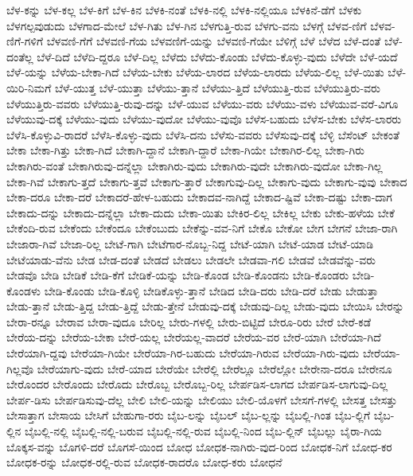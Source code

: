 {ಬೆಳ-ಕನ್ನು
ಬೆಳ-ಕಲ್ಲ
ಬೆಳ-ಕಿಗೆ
ಬೆಳ-ಕಿನ
ಬೆಳಕಿ-ನಂತೆ
ಬೆಳಕಿ-ನಲ್ಲಿ
ಬೆಳಕಿ-ನಲ್ಲಿಯೂ
ಬೆಳಕಿನೆ-ಡೆಗೆ
ಬೆಳಕು
ಬೆಳಗಲ್ಪವುಡುದು
ಬೆಳಗಾದ-ಮೇಲೆ
ಬೆಳ-ಗಿತು
ಬೆಳ-ಗಿನ
ಬೆಳಗುತ್ತಿ-ರುವ
ಬೆಳಗು-ವನು
ಬೆಳಗ್ಗೆ
ಬೆಳವ-ಣಿಗೆ
ಬೆಳವ-ಣಿಗೆ-ಗಳಿಗೆ
ಬೆಳವಣಿ-ಗೆಗೆ
ಬೆಳವಣಿ-ಗೆಯ
ಬೆಳವಣಿಗೆ-ಯನ್ನು
ಬೆಳವಣಿ-ಗೆಯೇ
ಬೆಳಿಗ್ಗೆ
ಬೆಳೆ
ಬೆಳೆದ
ಬೆಳೆ-ದಂತೆ
ಬೆಳೆ-ದಂತೆಲ್ಲ
ಬೆಳೆ-ದಿದೆ
ಬೆಳೆದಿ-ದ್ದರೂ
ಬೆಳೆ-ದಿಲ್ಲ
ಬೆಳೆದು
ಬೆಳೆದು-ಕೊಂಡು
ಬೆಳೆದು-ಕೊಳ್ಳು-ವುದು
ಬೆಳೆದೇ
ಬೆಳೆ-ಯದೆ
ಬೆಳೆ-ಯನ್ನು
ಬೆಳೆಯ-ಬೇಕಾ-ಗಿದೆ
ಬೆಳೆಯ-ಬೇಕು
ಬೆಳೆಯ-ಲಾರದ
ಬೆಳೆಯ-ಲಾರದು
ಬೆಳೆಯ-ಲಿಲ್ಲ
ಬೆಳೆ-ಯಿತು
ಬೆಳೆ-ಯಿರಿ-ನಿಮಗೆ
ಬೆಳೆ-ಯುತ್ತ
ಬೆಳೆ-ಯುತ್ತಾ
ಬೆಳೆಯು-ತ್ತಾನೆ
ಬೆಳೆಯು-ತ್ತಿದೆ
ಬೆಳೆಯುತ್ತಿ-ರುವ
ಬೆಳೆಯುತ್ತಿರು-ವರು
ಬೆಳೆಯುತ್ತಿರು-ವವರು
ಬೆಳೆಯುತ್ತಿ-ರುವು-ದನ್ನು
ಬೆಳೆ-ಯುವ
ಬೆಳೆಯು-ವರು
ಬೆಳೆಯು-ವಳು
ಬೆಳೆಯುವ-ವರೆ-ವಿಗೂ
ಬೆಳೆಯುವು-ದಕ್ಕೆ
ಬೆಳೆಯು-ವುದು
ಬೆಳೆಯು-ವುದೋ
ಬೆಳೆಯು-ವುವೊ
ಬೆಳೆಸ-ಬಹುದು
ಬೆಳೆಸ-ಬೇಕು
ಬೆಳೆಸ-ಲಾರರು
ಬೆಳೆಸಿ-ಕೊಳ್ಳುವಿ-ರಾದರೆ
ಬೆಳೆಸಿ-ಕೊಳ್ಳು-ವುದು
ಬೆಳೆಸಿ-ದನು
ಬೆಳೆಸು-ವವರು
ಬೆಳೆಸುವು-ದಕ್ಕೆ
ಬೆಳ್ಳಿ
ಬೆಸೆಂಟ್
ಬೇಕಂತೆ
ಬೇಕಾ
ಬೇಕಾ-ಗಿತ್ತು
ಬೇಕಾ-ಗಿದೆ
ಬೇಕಾಗಿ-ದ್ದಾನೆ
ಬೇಕಾಗಿ-ದ್ದಾರೆ
ಬೇಕಾ-ಗಿಯೇ
ಬೇಕಾಗಿರ-ಲಿಲ್ಲ
ಬೇಕಾ-ಗಿರು
ಬೇಕಾಗಿರು-ವಂತೆ
ಬೇಕಾಗಿರುವು-ದನ್ನೆಲ್ಲಾ
ಬೇಕಾಗಿರು-ವುದು
ಬೇಕಾಗಿರು-ವುದೇ
ಬೇಕಾಗಿರು-ವುದೋ
ಬೇಕಾ-ಗಿಲ್ಲ
ಬೇಕಾ-ಗಿವೆ
ಬೇಕಾಗು-ತ್ತದೆ
ಬೇಕಾಗು-ತ್ತವೆ
ಬೇಕಾಗು-ತ್ತಾರೆ
ಬೇಕಾಗುವು-ದಿಲ್ಲ
ಬೇಕಾಗು-ವುದು
ಬೇಕಾಗು-ವುವು
ಬೇಕಾದ
ಬೇಕಾ-ದರೂ
ಬೇಕಾ-ದರೆ
ಬೇಕಾದರೆ-ಹೇಳ-ಬಹುದು
ಬೇಕಾದವ-ನಾಗಿದ್ದೆ
ಬೇಕಾದ-ಷ್ಟಿವೆ
ಬೇಕಾ-ದಷ್ಟು
ಬೇಕಾ-ದಾಗ
ಬೇಕಾದು-ದನ್ನು
ಬೇಕಾದು-ದನ್ನೆಲ್ಲಾ
ಬೇಕಾ-ದುದು
ಬೇಕಾ-ಯಿತು
ಬೇಕಿರ-ಲಿಲ್ಲ
ಬೇಕಿಲ್ಲ
ಬೇಕು
ಬೇಕು-ಹಳೆಯ
ಬೇಕೆ
ಬೇಕೆಂದಿ-ರುವ
ಬೇಕೆಂದು
ಬೇಕೆಂದೂ
ಬೇಕೆಂಬುದು
ಬೇಕೆನ್ನು-ವವ-ನಿಗೆ
ಬೇಕೊ
ಬೇಕೋ
ಬೇಗ
ಬೇಗನೆ
ಬೇಜಾ-ರಾಗಿ
ಬೇಜಾರಾ-ಗಿವೆ
ಬೇಜಾ-ರಿಲ್ಲ
ಬೇಟೆ-ಗಾಗಿ
ಬೇಟೆಗಾರ-ನೊಬ್ಬ-ನಿದ್ದ
ಬೇಟೆ-ಯಾಗಿ
ಬೇಟೆ-ಯಾಡ
ಬೇಟೆ-ಯಾಡಿ
ಬೇಟೆಯಾಡು-ವೆನು
ಬೇಡ
ಬೇಡ-ದಂತೆ
ಬೇಡದೆ
ಬೇಡಲು
ಬೇಡಲೇ
ಬೇಡವಾ-ಗಲಿ
ಬೇಡವೆ
ಬೇಡವೆನ್ನು-ವರು
ಬೇಡವೊ
ಬೇಡಿ
ಬೇಡಿಕೆ
ಬೇಡಿ-ಕೆಗೆ
ಬೇಡಿಕೆ-ಯನ್ನು
ಬೇಡಿ-ಕೊಂಡ
ಬೇಡಿ-ಕೊಂಡನು
ಬೇಡಿ-ಕೊಂಡರು
ಬೇಡಿ-ಕೊಂಡಳು
ಬೇಡಿ-ಕೊಂಡು
ಬೇಡಿ-ಕೊಳ್ಳಿ
ಬೇಡಿಕೊಳ್ಳು-ತ್ತಾನೆ
ಬೇಡಿದ
ಬೇಡಿ-ದರು
ಬೇಡಿ-ದರೆ
ಬೇಡು
ಬೇಡುತ್ತಾ
ಬೇಡು-ತ್ತಾನೆ
ಬೇಡು-ತ್ತಿದ್ದ
ಬೇಡು-ತ್ತಿದ್ದೆ
ಬೇಡು-ತ್ತೇನೆ
ಬೇಡುವು-ದಕ್ಕೆ
ಬೇಡುವು-ದಿಲ್ಲ
ಬೇಡು-ವುದು
ಬೇಯಿಸಿ
ಬೇರನ್ನು
ಬೇರಾ-ರನ್ನೂ
ಬೇರಾವ
ಬೇರಾ-ವುದೂ
ಬೇರಿಲ್ಲ
ಬೇರು-ಗಳಲ್ಲಿ
ಬೇರು-ಬಿಟ್ಟಿದೆ
ಬೇರೂ-ರಿರು
ಬೇರೆ
ಬೇರೆ-ಕಡೆ
ಬೇರೆಯ-ದನ್ನು
ಬೇರೆಯ-ಬೇಕಾ
ಬೇರೆ-ಯಲ್ಲ
ಬೇರೆಯಲ್ಲ-ವಾದರೆ
ಬೇರೆಯ-ವರ
ಬೇರೆ-ಯಾಗಿ
ಬೇರೆಯಾ-ಗಿದೆ
ಬೇರೆಯಾಗಿ-ದ್ದವು
ಬೇರೆಯಾ-ಗಿಯೇ
ಬೇರೆಯಾ-ಗಿರ-ಬಹುದು
ಬೇರೆಯಾ-ಗಿರುವ
ಬೇರೆಯಾ-ಗಿರು-ವುದು
ಬೇರೆಯಾ-ಗಿಲ್ಲವೊ
ಬೇರೆಯಾಗು-ವುದು
ಬೇರೆ-ಯಾದ
ಬೇರೆಯೇ
ಬೇರೆಲ್ಲಿ
ಬೇರೆಲ್ಲೂ
ಬೇರೆಲ್ಲೋ
ಬೇರೇನಾ-ದರೂ
ಬೇರೇನೂ
ಬೇರೊಂದರ
ಬೇರೊಂದು
ಬೇರೊದು
ಬೇರೊಬ್ಬ
ಬೇರೊಬ್ಬ-ರಿಲ್ಲ
ಬೇರ್ಪಡಿಸ-ಲಾಗದ
ಬೇರ್ಪಡಿಸ-ಲಾಗುವು-ದಿಲ್ಲ
ಬೇರ್ಪ-ಡಿಸು
ಬೇರ್ಪಡಿಸುವು-ದೆಲ್ಲ
ಬೇಲಿ
ಬೇಲಿ-ಯನ್ನು
ಬೇಲಿಯು
ಬೇಲಿ-ಯೊಳಗೆ
ಬೇಸಗೆ-ಗಳಲ್ಲಿ
ಬೇಸತ್ತ
ಬೇಸತ್ತು
ಬೇಸಾತ್ತಾಗ
ಬೇಸಾಯ
ಬೇಸಿಗೆ
ಬೇಹುಗಾ-ರರು
ಬೈಬ-ಲನ್ನು
ಬೈಬಲ್
ಬೈಬ-ಲ್ಲನ್ನು
ಬೈಬಲ್ಲಿ-ಗಿಂತ
ಬೈಬ-ಲ್ಲಿಗೆ
ಬೈಬ-ಲ್ಲಿನ
ಬೈಬಲ್ಲಿ-ನಲ್ಲಿ
ಬೈಬಲ್ಲಿ-ನಲ್ಲಿ-ಬರುವ
ಬೈಬಲ್ಲಿ-ನಲ್ಲಿ-ರುವ
ಬೈಬಲ್ಲಿ-ನಿಂದ
ಬೈಬ-ಲ್ಲಿನ್
ಬೈಬಲ್ಲು
ಬೈರಾ-ಗಿಯ
ಬೊಕ್ಕಸ-ವನ್ನು
ಬೊಗಳಿ-ದರೆ
ಬೊಗಸೆ-ಯಿಂದ
ಬೋಧ
ಬೋಧಕ-ನಾಗಿರು-ವುದ-ರಿಂದ
ಬೋಧಕ-ನಿಗೆ
ಬೋಧ-ಕರ
ಬೋಧಕ-ರನ್ನು
ಬೋಧಕ-ರಲ್ಲಿ-ರುವ
ಬೋಧಕ-ರಾದರೊ
ಬೋಧ-ಕರು
ಬೋಧನೆ
}
